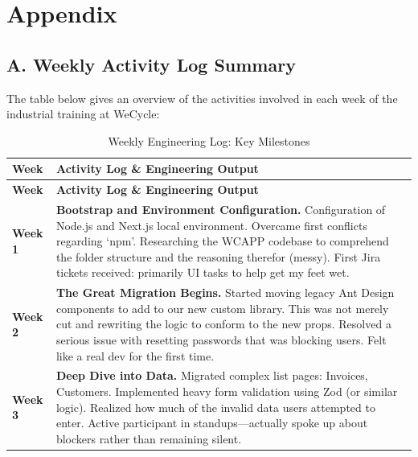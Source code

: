 \clearpage
\chapter*{Appendix}

\section*{A. Weekly Activity Log Summary}

\par The table below gives an overview of the activities involved in each week of the industrial training at WeCycle:

\begin{longtable}{|p{2cm}|p{13cm}|}
\caption{Weekly Engineering Log: Key Milestones} \label{tab:weekly-summary} \\
\hline
\textbf{Week} & \textbf{Activity Log \& Engineering Output} \\
\hline
\endfirsthead

\hline
\textbf{Week} & \textbf{Activity Log \& Engineering Output} \\
\hline
\endhead

\hline
\endfoot

\hline
\endlastfoot

\textbf{Week 1} & \textbf{Bootstrap and Environment Configuration.} Configuration of Node.js and Next.js local environment. Overcame first conflicts regarding `npm'. Researching the WCAPP codebase to comprehend the folder structure and the reasoning therefor (messy). First Jira tickets received: primarily UI tasks to help get my feet wet. \\
\hline

\textbf{Week 2} & \textbf{The Great Migration Begins.} Started moving legacy Ant Design components to add to our new custom library. This was not merely cut and rewriting the logic to conform to the new props. Resolved a serious issue with resetting passwords that was blocking users. Felt like a real dev for the first time. \\
\hline

\textbf{Week 3} & \textbf{Deep Dive into Data.} Migrated complex list pages: Invoices, Customers. Implemented heavy form validation using Zod (or similar logic). Realized how much of the invalid data users attempted to enter. Active participant in standups—actually spoke up about blockers rather than remaining silent. \\
\hline


\end{longtable}
